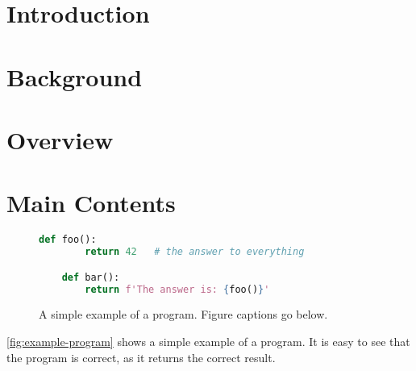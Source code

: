 \documentclass[thesis]{plai}
\begin{document}
\vspace{1,5cm}







\newpage
\tableofcontents
\newpage

\setcounter{page}{1}
\pagestyle{fancy}
\fancyhf{}
\fancyhead[R]{\thepage}
\renewcommand{\headrulewidth}{0pt}

\chapter{Introduction}
\label{chapter:introduction}



\chapter{Background}
\label{chapter:background}



\chapter{Overview}
\label{chapter:overview}



\chapter{Main Contents}
\label{chapter:content1}

\lipsum[2-8]

\begin{figure}[t]
    \begin{lstlisting}[language=Python, gobble=4]
    def foo():
        return 42   # the answer to everything

    def bar():
        return f'The answer is: {foo()}'
    \end{lstlisting}
    \caption{A simple example of a program. Figure captions go below.}
    \label{fig:example-program}
\end{figure}

\autoref{fig:example-program} shows a simple example of a program.
It is easy to see that the program is correct, as it returns the correct result.
\end{document}
